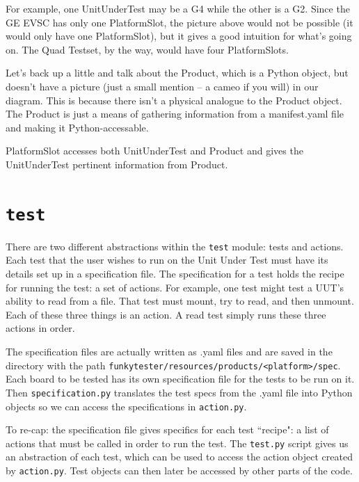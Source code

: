 \documentclass{report}
\begin{document}
For example, one UnitUnderTest may be a G4 while the other is a G2. Since the GE EVSC has only one PlatformSlot, the picture above would not be possible (it would only have one PlatformSlot), but it gives a good intuition for what's going on. The Quad Testset, by the way, would have four PlatformSlots.

Let's back up a little and talk about the Product, which is a Python object, but doesn't have a picture (just a small mention -- a cameo if you will) in our diagram. This is because there isn't a physical analogue to the Product object. The Product is just a means of gathering information from a manifest.yaml file and making it Python-accessable. %

PlatformSlot accesses both UnitUnderTest and Product and gives the UnitUnderTest pertinent information from Product.

\section{\texttt{test}}
There are two different abstractions within the \texttt{test} module: tests and actions. Each test that the user wishes to run on the Unit Under Test must have its details set up in a specification file. The specification for a test holds the recipe for running the test: a set of actions. For example, one test might test a UUT's ability to read from a file. That test must mount, try to read, and then unmount. Each of these three things is an action. A read test simply runs these three actions in order.

The specification files are actually written as .yaml files and are saved in the directory with the path \texttt{funkytester/resources/products/<platform>/spec}. Each board to be tested has its own specification file for the tests to be run on it. Then  \texttt{specification.py} translates the test specs from the .yaml file into Python objects so we can access the specifications in \texttt{action.py}.

To re-cap: the specification file gives specifics for each test ``recipe": a list of actions that must be called in order to run the test. The \texttt{test.py} script gives us an abstraction of each test, which can be used to access the action object created by \texttt{action.py}. Test objects can then later be accessed by other parts of the code.\\
\end{document}
